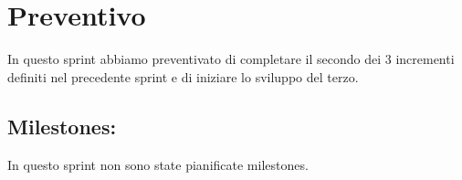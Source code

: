 \section{Preventivo}

In questo sprint abbiamo preventivato di completare il secondo dei 3 incrementi definiti nel precedente sprint e di iniziare lo sviluppo del terzo.

\subsection{Milestones:}  

In questo sprint non sono state pianificate milestones.
